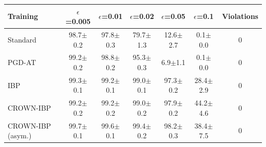\begin{tabular}{lcccccc}
\toprule
Training & $\epsilon$=0.005 & $\epsilon$=0.01 & $\epsilon$=0.02 & $\epsilon$=0.05 & $\epsilon$=0.1 & Violations \\
\midrule
Standard & 98.7$\pm$0.2 & 97.8$\pm$0.3 & 79.7$\pm$1.3 & 12.6$\pm$2.7 & 0.1$\pm$0.0 & 0 \\
PGD-AT & 99.2$\pm$0.2 & 98.8$\pm$0.2 & 95.3$\pm$0.3 & 6.9$\pm$1.1 & 0.1$\pm$0.0 & 0 \\
IBP & 99.3$\pm$0.1 & 99.2$\pm$0.1 & 99.0$\pm$0.1 & 97.3$\pm$0.2 & 28.4$\pm$2.9 & 0 \\
CROWN-IBP & 99.2$\pm$0.2 & 99.2$\pm$0.2 & 99.0$\pm$0.2 & 97.9$\pm$0.2 & 44.2$\pm$4.6 & 0 \\
CROWN-IBP (asym.) & 99.7$\pm$0.1 & 99.6$\pm$0.1 & 99.4$\pm$0.2 & 98.2$\pm$0.3 & 38.4$\pm$7.5 & 0 \\
\bottomrule
\end{tabular}